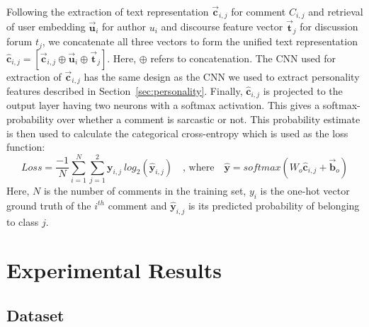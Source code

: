 \documentclass[11pt]{article}
\begin{document}
{Following the extraction of text representation $\vec{\bm{c}}_{i,j}$ for comment $C_{i,j}$ and retrieval of user embedding $\vec{\bm{u}}_{i}$ for author $u_i$ and discourse feature vector $\vec{\bm{t}}_{j}$ for discussion forum $t_j$, we concatenate all three vectors to form the unified text representation $\hat{\bm{c}}_{i,j} = [\vec{\bm{c}}_{i,j} \oplus \vec{\bm{u}}_{i} \oplus \vec{\bm{t}}_{j}]$.  Here, $\oplus$ refers to concatenation. The CNN used for extraction of $\vec{\bm{c}}_{i,j}$ has the same design as the CNN we used to extract personality features described in Section~\ref{sec:personality}. Finally, $\hat{\bm{c}}_{i,j}$ is projected to the output layer having two neurons with a softmax activation. This gives a softmax-probability over whether a comment is sarcastic or not. This probability estimate is then used to calculate the categorical cross-entropy which is used as the loss function:
\begin{equation}
Loss = \frac{-1}{N}{\sum_{i=1}^{N}} {\sum_{j=1}^{2}}{\bm{y}_{i,j} \ log_2 (\hat{\bm{y}}_{i,j} )} \quad \text{, where} \quad \hat{\bm{y}} = softmax( W_o\hat{\bm{c}}_{i,j} + \vec{\bm{b}}_o )
\end{equation}
Here, $N$ is the number of comments in the training set, $y_{i}$ is the one-hot vector ground truth of the $i^{th}$ comment and $\hat{\bm{y}}_{i,j} $ is its predicted probability of belonging to class $j$.

\section{Experimental Results} \label{sec:experiments}
\subsection{Dataset}\label{sec:dataset}

}
\end{document}
